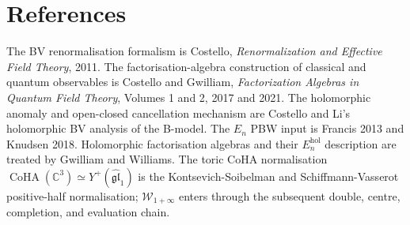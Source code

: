 \documentclass[11pt]{article}
\providecommand{\C}{\mathbb{C}}
\providecommand{\CoHA}{\operatorname{CoHA}}
\providecommand{\cW}{\mathcal{W}}
\providecommand{\Yp}{Y^+}
\theoremstyle{plain}
\theoremstyle{definition}
\theoremstyle{remark}
\begin{document}
\section{References}
\label{sec:references}

The BV renormalisation formalism is Costello, \emph{Renormalization
and Effective Field Theory}, 2011. The factorisation-algebra
construction of classical and quantum observables is Costello and
Gwilliam, \emph{Factorization Algebras in Quantum Field Theory},
Volumes 1 and 2, 2017 and 2021. The holomorphic anomaly and
open-closed cancellation mechanism are Costello and Li's holomorphic
BV analysis of the B-model. The \(E_n\) PBW input is Francis 2013 and
Knudsen 2018. Holomorphic factorisation algebras and their
\(E_n^{\mathrm{hol}}\) description are treated by Gwilliam and
Williams. The toric CoHA normalisation
\(\CoHA(\C^3)\simeq\Yp(\widehat{\mathfrak{gl}}_1)\) is the
Kontsevich-Soibelman and Schiffmann-Vasserot positive-half
normalisation; \(\cW_{1+\infty}\) enters through the subsequent
double, centre, completion, and evaluation chain.
\end{document}
